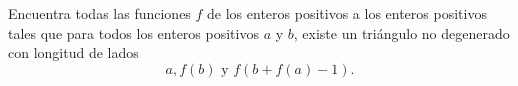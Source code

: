 Encuentra todas las funciones $f$ de los enteros positivos a los enteros positivos tales que para todos los enteros positivos $a$ y $b$, existe un triángulo no degenerado con longitud de lados 
\[ a, f(b) \text{ y } f(b + f(a) - 1).\]